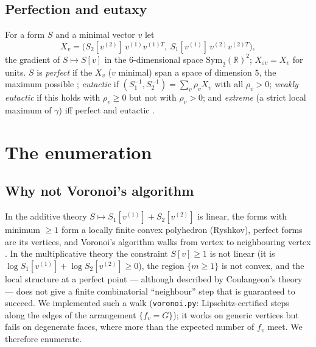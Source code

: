 \documentclass[11pt]{amsart}
\theoremstyle{definition}
\theoremstyle{remark}
\newcommand{\R}{\mathbb{R}}
\begin{document}
\subsection{Perfection and eutaxy}
For a form $S$ and a minimal vector $v$ let
\[
X_v=\bigl(S_2[v^{(2)}]\,v^{(1)}v^{(1)T},\ S_1[v^{(1)}]\,v^{(2)}v^{(2)T}\bigr),
\]
the gradient of $S\mapsto S[v]$ in the $6$-dimensional space $\mathrm{Sym}_2(\R)^2$; $X_{\varepsilon v}=X_v$
for units.  $S$ is \emph{perfect} if the $X_v$ ($v$ minimal) span a space of dimension $5$,
the maximum possible \cite{Coulangeon,BCIO}; \emph{eutactic} if
$(S_1^{-1},S_2^{-1})=\sum_v\rho_vX_v$ with all $\rho_v>0$; \emph{weakly eutactic} if this
holds with $\rho_v\ge0$ but not with $\rho_v>0$; and \emph{extreme} (a strict local maximum of
$\gamma$) iff perfect and eutactic \cite{Coulangeon}.

\section{The enumeration}\label{sec:algo}

\subsection{Why not Voronoi's algorithm}\label{subsec:whynot}
In the additive theory $S\mapsto S_1[v^{(1)}]+S_2[v^{(2)}]$ is linear, the forms with minimum
$\ge1$ form a locally finite convex polyhedron (Ryshkov), perfect forms are its vertices, and
Voronoi's algorithm walks from vertex to neighbouring vertex
\cite{Voronoi,Leibak,GY}.  In the multiplicative theory the constraint $S[v]\ge1$ is
not linear (it is $\log S_1[v^{(1)}]+\log S_2[v^{(2)}]\ge0$), the region $\{m\ge1\}$ is not
convex, and the local structure at a perfect point --- although described by Coulangeon's
theory --- does not give a finite combinatorial ``neighbour'' step that is guaranteed to
succeed.  We implemented such a walk (\texttt{voronoi.py}: Lipschitz-certified steps along the
edges of the arrangement $\{f_v=G\}$); it works on generic vertices but fails on degenerate
faces, where more than the expected number of $f_v$ meet.  We therefore enumerate.
\end{document}
